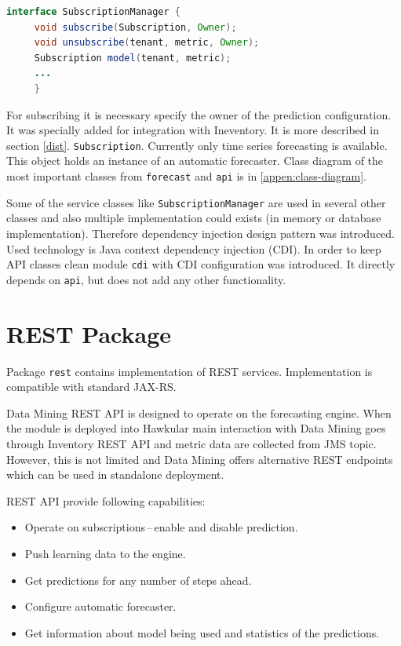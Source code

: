     \begin{lstlisting}[caption={Interface \texttt{SubscriptionManager}.}, language=Java, label={alg:sub-manager}]
interface SubscriptionManager {
     void subscribe(Subscription, Owner);
     void unsubscribe(tenant, metric, Owner);
     Subscription model(tenant, metric);
     ...
     }
    \end{lstlisting}

    For subscribing it is necessary specify the owner of the prediction configuration. It was specially added for
    integration with Ineventory. It is more described in section \ref{dist}. \texttt{Subscription}. Currently  only
    time series forecasting is available. This object holds an instance of an automatic forecaster. Class diagram  of
    the most important classes from \texttt{forecast} and \texttt{api} is in \ref{appen:class-diagram}.

    Some of the service classes like \texttt{SubscriptionManager} are used in several other classes and also multiple
    implementation could exists (in memory or database implementation). Therefore dependency injection
    design pattern was introduced. Used technology is Java context dependency injection (CDI). In order to keep
    API classes clean module \texttt{cdi} with CDI configuration was introduced. It directly depends on \texttt{api},
    but does not add any other functionality.

    \section{REST Package}
    Package \texttt{rest} contains implementation of REST services. Implementation is compatible with standard JAX-RS.

    Data Mining REST API is designed to operate on the forecasting engine. When the module is deployed into Hawkular
    main interaction with Data Mining goes through Inventory REST API and metric data are collected from JMS topic.
    However, this is not limited and Data Mining offers alternative REST endpoints which can be used in standalone
    deployment.

    REST API provide following capabilities:

    \begin{itemize}
        \item Operate on subscriptions\,--\,enable and disable prediction.
        \item Push learning data to the engine.
        \item Get predictions for any number of steps ahead.
        \item Configure automatic forecaster.
        \item Get information about model being used and statistics of the predictions.
    \end{itemize}

